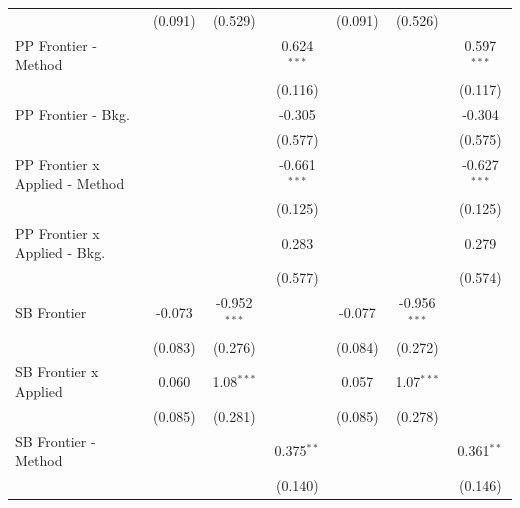 \begin{tabular}{lcccccc}
                                  & (0.091)        & (0.529)        &                & (0.091)        & (0.526)        &   \\   
   PP Frontier - Method           &                &                & 0.624$^{***}$  &                &                & 0.597$^{***}$\\   
                                  &                &                & (0.116)        &                &                & (0.117)\\   
   PP Frontier - Bkg.             &                &                & -0.305         &                &                & -0.304\\   
                                  &                &                & (0.577)        &                &                & (0.575)\\   
   PP Frontier x Applied - Method &                &                & -0.661$^{***}$ &                &                & -0.627$^{***}$\\   
                                  &                &                & (0.125)        &                &                & (0.125)\\   
   PP Frontier x Applied - Bkg.   &                &                & 0.283          &                &                & 0.279\\   
                                  &                &                & (0.577)        &                &                & (0.574)\\   
   SB Frontier                    & -0.073         & -0.952$^{***}$ &                & -0.077         & -0.956$^{***}$ &   \\   
                                  & (0.083)        & (0.276)        &                & (0.084)        & (0.272)        &   \\   
   SB Frontier x Applied          & 0.060          & 1.08$^{***}$   &                & 0.057          & 1.07$^{***}$   &   \\   
                                  & (0.085)        & (0.281)        &                & (0.085)        & (0.278)        &   \\   
   SB Frontier - Method           &                &                & 0.375$^{**}$   &                &                & 0.361$^{**}$\\   
                                  &                &                & (0.140)        &                &                & (0.146)\\   

\end{tabular}
